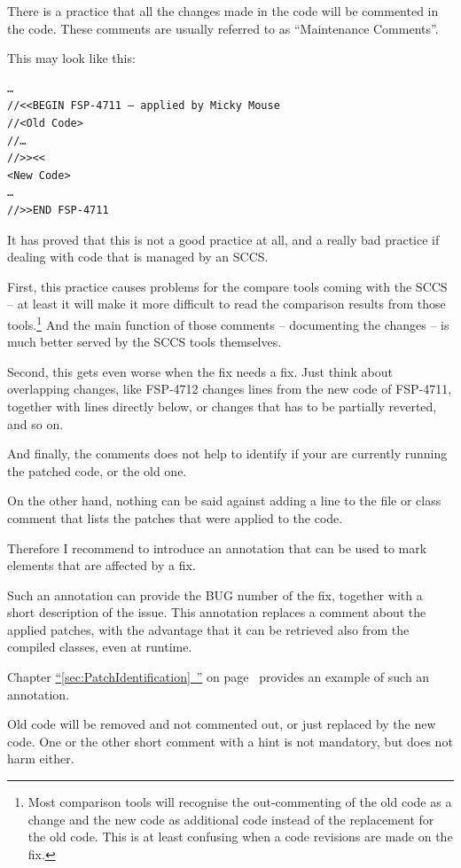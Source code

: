 \documentclass[11pt,a4paper, titlepage, parskip=half, headsepline, footsepline, cleardoublepage=current, headheight=1cm]{scrbook}
\newcommand*{\tqfullvref}[1]{\hyperref[{#1}]{“\ref*{#1}~\nameref*{#1}”} on page~\pageref{#1}}
\begin{document}
There is a practice that all the changes made in the code will be commented in the code. These comments are usually referred to as “Maintenance Comments”.

This may look like this:
\begin{lstlisting}
…
//<<BEGIN FSP-4711 – applied by Micky Mouse
//<Old Code>
//…
//>><<
<New Code>
…
//>>END FSP-4711
\end{lstlisting}

It has proved that this is not a good practice at all, and a really bad practice if dealing with code that is managed by an SCCS.

First, this practice causes problems for the compare tools coming with the SCCS – at least it will make it more difficult to read the comparison results from those tools.\footnote{Most comparison tools will recognise the out-commenting of the old code as a change and the new code as additional code instead of the replacement for the old code. This is at least confusing when a code revisions are made on the fix.} And the main function of those comments – documenting the changes – is much better served by the SCCS tools themselves.

Second, this gets even worse when the fix needs a fix. Just think about overlapping changes, like FSP-4712 changes lines from the new code of FSP-4711, together with lines directly below, or changes that has to be partially reverted, and so on.

And finally, the comments does not help to identify if your are currently running the patched code, or the old one.

On the other hand, nothing can be said against adding a line to the file or class comment that lists the patches that were applied to the code.

Therefore I recommend to introduce an annotation that can be used to mark elements that are affected by a fix.

Such an annotation can provide the BUG number of the fix, together with a short description of the issue. This annotation replaces a comment about the applied patches, with the advantage that it can be retrieved also from the compiled classes, even at runtime.

Chapter \tqfullvref{sec:PatchIdentification} provides an example of such an annotation.

Old code will be removed and not commented out, or just replaced by the new code. One or the other short comment with a hint is not mandatory, but does not harm either.
\end{document}
